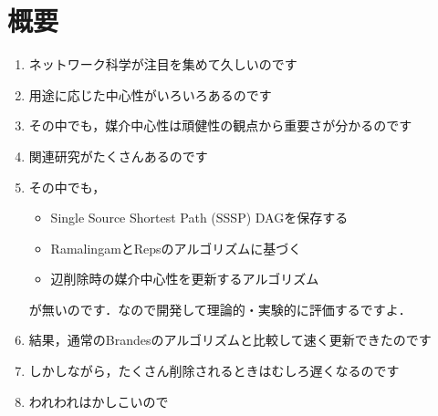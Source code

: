 \chapter*{概要}

\begin{enumerate}
\item ネットワーク科学が注目を集めて久しいのです
\item 用途に応じた中心性がいろいろあるのです
\item その中でも，媒介中心性は頑健性の観点から重要さが分かるのです
\item 関連研究がたくさんあるのです
\item その中でも，
  \begin{itemize}
  \item Single Source Shortest Path (SSSP) DAGを保存する
  \item RamalingamとRepsのアルゴリズムに基づく
  \item 辺削除時の媒介中心性を更新するアルゴリズム
  \end{itemize}
  \par が無いのです．なので開発して理論的・実験的に評価するですよ．
\item 結果，通常のBrandesのアルゴリズムと比較して速く更新できたのです
\item しかしながら，たくさん削除されるときはむしろ遅くなるのです
\item われわれはかしこいので
\end{enumerate}

